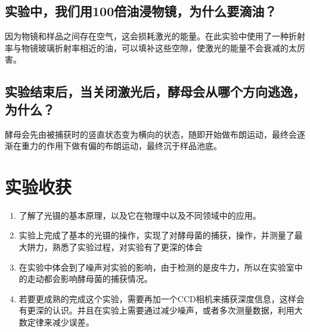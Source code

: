 \documentclass[a4paper,UTF8]{ctexart}
\begin{document}
\subsection{实验中，我们用100倍油浸物镜，为什么要滴油？}

因为物镜和样品之间存在空气，这会损耗激光的能量。在此实验中使用了一种折射率与物镜玻璃折射率相近的油，可以填补这些空隙，使激光的能量不会衰减的太厉害。

\subsection{实验结束后，当关闭激光后，酵母会从哪个方向逃逸，为什么？}

酵母会先由被捕获时的竖直状态变为横向的状态，随即开始做布朗运动，最终会逐渐在重力的作用下做有偏的布朗运动，最终沉于样品池底。

\section{实验收获}

\begin{enumerate}
    \item 了解了光镊的基本原理，以及它在物理中以及不同领域中的应用。
    \item 实验上完成了基本的光镊的操作，实现了对酵母菌的捕获，操作，并测量了最大阱力，熟悉了实验过程，对实验有了更深的体会
    \item 在实验中体会到了噪声对实验的影响，由于检测的是皮牛力，所以在实验室中的走动都会影响酵母菌的捕获情况。
    \item 若要更成熟的完成这个实验，需要再加一个CCD相机来捕获深度信息，这样会有更深的认识。并且在实验上需要通过减少噪声，或者多次测量数据，利用大数定律来减少误差。
\end{enumerate}
\end{document}
